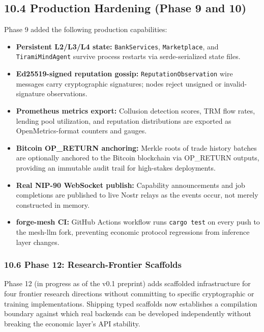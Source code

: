 \documentclass[
  11pt,
]{article}
\providecommand{\tightlist}{%
  \setlength{\itemsep}{0pt}\setlength{\parskip}{0pt}}
\begin{document}
\subsection{10.4 Production Hardening (Phase 9 and
10)}\label{production-hardening-phase-9-and-10}

Phase 9 added the following production capabilities:

\begin{itemize}
\tightlist
\item
  \textbf{Persistent L2/L3/L4 state:} \texttt{BankServices},
  \texttt{Marketplace}, and \texttt{TiramiMindAgent} survive process
  restarts via serde-serialized state files.
\item
  \textbf{Ed25519-signed reputation gossip:}
  \texttt{ReputationObservation} wire messages carry cryptographic
  signatures; nodes reject unsigned or invalid-signature observations.
\item
  \textbf{Prometheus metrics export:} Collusion detection scores, TRM
  flow rates, lending pool utilization, and reputation distributions are
  exported as OpenMetrics-format counters and gauges.
\item
  \textbf{Bitcoin OP\_RETURN anchoring:} Merkle roots of trade history
  batches are optionally anchored to the Bitcoin blockchain via
  OP\_RETURN outputs, providing an immutable audit trail for high-stakes
  deployments.
\item
  \textbf{Real NIP-90 WebSocket publish:} Capability announcements and
  job completions are published to live Nostr relays as the events
  occur, not merely constructed in memory.
\item
  \textbf{forge-mesh CI:} GitHub Actions workflow runs
  \texttt{cargo\ test} on every push to the mesh-llm fork, preventing
  economic protocol regressions from inference layer changes.
\end{itemize}

\subsubsection{10.6 Phase 12: Research-Frontier
Scaffolds}\label{phase-12-research-frontier-scaffolds}

Phase 12 (in progress as of the v0.1 preprint) adds scaffolded
infrastructure for four frontier research directions without committing
to specific cryptographic or training implementations. Shipping typed
scaffolds now establishes a compilation boundary against which real
backends can be developed independently without breaking the economic
layer's API stability.
\end{document}
